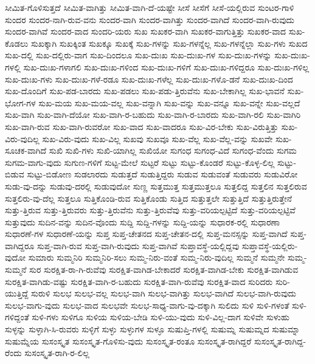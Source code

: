 {ಸೀಮಿತ-ಗೊಳಿಸುತ್ತದೆ
ಸೀಮಿತ-ವಾಗಿತ್ತು
ಸೀಮಿತ-ವಾಗಿ-ದೆ-ಯಷ್ಟೇ
ಸೀಸೆ
ಸೀಸೆಗೆ
ಸೀಸೆ-ಯಲ್ಲಿರುವ
ಸುಂಟರ-ಗಾಳಿ
ಸುಂದರ
ಸುಂದರ-ನಾಗಿ-ರುವ-ವನು
ಸುಂದರ-ವಾಗಿ
ಸುಂದರ-ವಾಗಿತ್ತು
ಸುಂದರ-ವಾಗಿದೆ
ಸುಂದರ-ವಾಗಿ-ರುವುದು
ಸುಂದರ-ವಾಗಿವೆ
ಸುಂದರ-ವಾದ
ಸುಂದರಿ-ಯರು
ಸುಖ
ಸುಖಕರ-ವಾಗಿ
ಸುಖಕರ-ವಾಗುತ್ತಿತ್ತು
ಸುಖಕರ-ವಾದ
ಸುಖ-ಕೊಡಲು
ಸುಖಕ್ಕಾಗಿ
ಸುಖಕ್ಕಿಂತ
ಸುಖಕ್ಕೂ
ಸುಖಕ್ಕೆ
ಸುಖ-ಗಳನ್ನು
ಸುಖ-ಗಳನ್ನೆಲ್ಲ
ಸುಖ-ಗಳನ್ನೆಲ್ಲಾ
ಸುಖ-ಗಳು
ಸುಖದ
ಸುಖ-ದಲ್ಲಿ
ಸುಖ-ದಲ್ಲಿರು-ವಾಗ
ಸುಖ-ದಿಂದಲೂ
ಸುಖ-ದುಃಖ
ಸುಖ-ದುಃಖ-ಗಳ
ಸುಖ-ದುಃಖ-ಗಳನ್ನು
ಸುಖ-ದುಃಖ-ಗಳಲ್ಲಿ
ಸುಖ-ದುಃಖ-ಗಳಾಗಲಿ
ಸುಖ-ದುಃಖ-ಗಳಿಂದ
ಸುಖ-ದುಃಖ-ಗಳಿಗೆ
ಸುಖ-ದುಃಖ-ಗಳಿದ್ದರೂ
ಸುಖ-ದುಃಖ-ಗಳಿಲ್ಲ
ಸುಖ-ದುಃಖ-ಗಳು
ಸುಖ-ದುಃಖ-ಗಳೆ-ರಡೂ
ಸುಖ-ದುಃಖ-ಗಳೆಲ್ಲ
ಸುಖ-ದುಃಖ-ಗಳೊ-ಡನೆ
ಸುಖ-ದುಃಖ-ದಿಂದ
ಸುಖ-ದೊಂದಿಗೆ
ಸುಖ-ಪಡ-ಬಾರದು
ಸುಖ-ಪಡಲು
ಸುಖ-ಪಡು-ತ್ತಿರುವೆನು
ಸುಖ-ಬೇಕಾಗಿಲ್ಲ
ಸುಖ-ಭಾವನೆ
ಸುಖ-ಭೋಗ-ಗಳ
ಸುಖ-ಮಯ
ಸುಖ-ಮಯ-ವಲ್ಲ
ಸುಖ-ವನ್ನಾಗಿ
ಸುಖ-ವನ್ನು
ಸುಖ-ವನ್ನೂ
ಸುಖ-ವನ್ನೇ
ಸುಖ-ವಲ್ಲದೆ
ಸುಖ-ವಾಗಿ
ಸುಖ-ವಾಗಿ-ದೆಯೋ
ಸುಖ-ವಾಗಿ-ರ-ಬಹುದು
ಸುಖ-ವಾಗಿ-ರ-ಬಾರದು
ಸುಖ-ವಾಗಿ-ರಲಿ
ಸುಖ-ವಾಗಿರಿ
ಸುಖ-ವಾಗಿ-ರುವ
ಸುಖ-ವಾಗಿ-ರುವರೋ
ಸುಖ-ವಾದ
ಸುಖ-ವಾದರೂ
ಸುಖ-ವಿರ-ಬೇಕು
ಸುಖ-ವಿರುತ್ತಿತ್ತು
ಸುಖ-ವಿರು-ವುದಿಲ್ಲ
ಸುಖ-ವಿರು-ವುದು
ಸುಖ-ವಿಲ್ಲ
ಸುಖವು
ಸುಖವೂ
ಸುಖ-ವೆಲ್ಲ
ಸುಖ-ವೆಲ್ಲ-ವನ್ನು
ಸುಖವೇ
ಸುಖ-ಸೂಚಕ-ವಾಗಿದೆ
ಸುಖಿ
ಸುಖಿ-ಗಳು
ಸುಖಿ-ಯಾಗಿಲ್ಲ
ಸುಖಿಯೋ
ಸುಗಂಧ
ಸುಗಂಧ-ವಿದೆ
ಸುಗಂಧ-ವೆಂದು
ಸುಗಮ
ಸುಗಮ-ವಾಗು-ವುದು
ಸುಗುಣ-ಗಳಿಗೆ
ಸುಟ್ಟ-ಮೇಲೆ
ಸುಟ್ಟರೆ
ಸುಟ್ಟು
ಸುಟ್ಟು-ಕೊಂಡರೆ
ಸುಟ್ಟು-ಕೊಳ್ಳ-ಲಿಲ್ಲ
ಸುಟ್ಟು-ಬಿಡುವ
ಸುಟ್ಟು-ಬಿಡೋಣ
ಸುಡಲಾರದು
ಸುಡುತ್ತದೆ
ಸುಡುತ್ತಿದ್ದರು
ಸುಡುವ
ಸುಡುವಂತೆ
ಸುಡುವರು
ಸುಡುವಿರೋ
ಸುಡು-ವು-ದನ್ನು
ಸುಡುವು-ದರಲ್ಲಿ
ಸುಡುವುದೋ
ಸುಣ್ಣ
ಸುತ್ತಮುತ್ತ
ಸುತ್ತಮುತ್ತಲೂ
ಸುತ್ತಲಿದ್ದ
ಸುತ್ತಲಿನ
ಸುತ್ತಲಿರುವ
ಸುತ್ತಲಿರು-ವು-ದೆಲ್ಲ
ಸುತ್ತಲೂ
ಸುತ್ತಿಕೊಂಡಿ-ರುವ
ಸುತ್ತಿಕೊಂಡು
ಸುತ್ತಿದ
ಸುತ್ತುತ್ತಲೇ
ಸುತ್ತುತ್ತಿದೆ
ಸುತ್ತುತ್ತಿರುತ್ತೇನೆ
ಸುತ್ತು-ತ್ತಿರುವ
ಸುತ್ತು-ತ್ತಿರುವರು
ಸುತ್ತು-ತ್ತಿರುವೆನು
ಸುತ್ತು-ತ್ತಿರುವೆವು
ಸುತ್ತು-ವರಿಯಲ್ಪಟ್ಟಿದೆ
ಸುತ್ತು-ವರಿಯಲ್ಪಟ್ಟಿವೆ
ಸುತ್ತುವುದು
ಸುದಿನ-ವನ್ನು
ಸುದಿನ-ವೊಂದು
ಸುದ್ದಿ
ಸುದ್ದಿ-ಗಳನ್ನು
ಸುದ್ದಿ-ಯನ್ನು
ಸುಧಾರಕ-ರಲ್ಲಿ
ಸುಧಾರಣಾ
ಸುಧಾರಣೆ-ಗಳ
ಸುಧಾರಣೆ-ಯನ್ನು
ಸುಪ್ತ
ಸುಪ್ತ-ಚೇತನದ
ಸುಪ್ತ-ಚೇತನ-ದಲ್ಲಿ
ಸುಪ್ತ-ಮನಸ್ಸನ್ನು
ಸುಪ್ತ-ವಾಗಿದೆ
ಸುಪ್ತ-ವಾಗಿದ್ದರೂ
ಸುಪ್ತ-ವಾಗಿ-ರುವ
ಸುಪ್ತ-ವಾಗಿ-ರುವುದು
ಸುಪ್ತ-ವಾಗಿವೆ
ಸುಪ್ತಾವಸ್ಥೆ-ಯಲ್ಲಿದ್ದವು
ಸುಪ್ತಾವಸ್ಥೆ-ಯಲ್ಲಿರು-ವುದೋ
ಸುಮಾರು
ಸುಮ್ಮನಿರಿ
ಸುಮ್ಮನಿರಿ-ಸಲು
ಸುಮ್ಮ-ನಿರು-ವಂತೆ
ಸುಮ್ಮ-ನಿರು-ವುದಿಲ್ಲ
ಸುಮ್ಮನೆ
ಸುಮ್ಮನೇ
ಸುಮ್ಮ-ಸುಮ್ಮನೆ
ಸುರ
ಸುರಕ್ಷಿತ-ರಾ-ಗಿ-ರುವೆವು
ಸುರಕ್ಷಿತ-ವಾಗಿಡ-ಬೇಕಾದರೆ
ಸುರಕ್ಷಿತ-ವಾಗಿಡ-ಬೇಕು
ಸುರಕ್ಷಿತ-ವಾಗಿಡುವ
ಸುರಕ್ಷಿತ-ವಾಗಿಡು-ವಷ್ಟು
ಸುರಕ್ಷಿತ-ವಾಗಿ-ರ-ಬಹುದು
ಸುರಕ್ಷಿತ-ವಾಗಿ-ರುವೆವು
ಸುರಕ್ಷಿತ-ವಾದ
ಸುರಿದರು
ಸುರಿ-ಯುತ್ತಿದ್ದೆ
ಸುರುಳಿ
ಸುಲಭ
ಸುಲಭ-ವಲ್ಲ
ಸುಲಭ-ವಾಗಿ
ಸುಲಭ-ವಾಗಿತ್ತು
ಸುಲಭ-ವಾಗಿದೆ
ಸುಲಭ-ವಾಗಿ-ರುವುದು
ಸುಲಭ-ವಾಗು-ವುದು
ಸುಲಭ-ವಾದ
ಸುಲಭವೇ
ಸುಲಭ-ಸಾಧ್ಯ-ವಾಗು-ವು-ದಕ್ಕಾಗಿ
ಸುಲಿದು
ಸುಳಿ
ಸುಳಿ-ಗಳಂತೆ
ಸುಳಿ-ಗಳಿದ್ದಂತೆ
ಸುಳಿ-ಗಳು
ಸುಳಿಗೂ
ಸುಳಿಯ
ಸುಳಿಯ-ಬೇಡಿ
ಸುಳಿ-ಯು-ವುದು
ಸುಳಿ-ವಿಲ್ಲ-ದಾಗ
ಸುಳಿವೇ
ಸುಳುಹು
ಸುಳ್ಳನ್ನು
ಸುಳ್ಳಾಗಿ-ಸಿ-ರುವರು
ಸುಳ್ಳಿಗೆ
ಸುಳ್ಳು
ಸುಳ್ಳುಗಳ
ಸುಳ್ಳೂ
ಸುಷುಪ್ತಿ-ಗಳಲ್ಲಿ
ಸುಷುಮ್ನ
ಸುಷುಮ್ನದ
ಸುಷುಮ್ನಾ
ಸುಷುಮ್ನೆಯ
ಸುಸಂಸ್ಕೃತ
ಸುಸಂಸ್ಕೃತ-ಗೊಳಿಸು-ವುದು
ಸುಸಂಸ್ಕೃತ-ರಂತೂ
ಸುಸಂಸ್ಕೃತ-ರಾಗಿದ್ದರೆ
ಸುಸಂಸ್ಕೃತ-ರಾಗಿದ್ದ-ರೆಂದು
ಸುಸಂಸ್ಕೃತ-ರಾಗಿ-ರ-ಲಿಲ್ಲ
}
